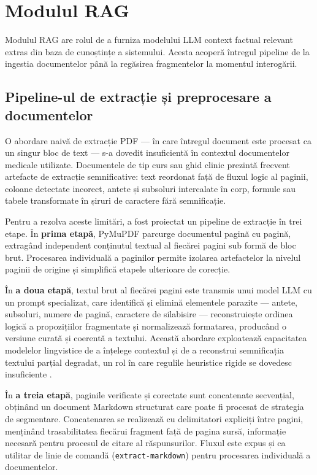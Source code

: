 \documentclass[12pt, a4paper, oneside, romanian]{teza-upb}
\begin{document}
\section{Modulul RAG}

Modulul RAG are rolul de a furniza modelului LLM context factual relevant extras din baza de cunoștințe a sistemului. Acesta acoperă întregul pipeline de la ingestia documentelor până la regăsirea fragmentelor la momentul interogării.

\subsection{Pipeline-ul de extracție și preprocesare a documentelor}

O abordare naivă de extracție PDF — în care întregul document este procesat ca un singur bloc de text — s-a dovedit insuficientă în contextul documentelor medicale utilizate. Documentele de tip curs sau ghid clinic prezintă frecvent artefacte de extracție semnificative: text reordonat față de fluxul logic al paginii, coloane detectate incorect, antete și subsoluri intercalate în corp, formule sau tabele transformate în șiruri de caractere fără semnificație.

Pentru a rezolva aceste limitări, a fost proiectat un pipeline de extracție în trei etape. În \textbf{prima etapă}, PyMuPDF parcurge documentul pagină cu pagină, extragând independent conținutul textual al fiecărei pagini sub formă de bloc brut. Procesarea individuală a paginilor permite izolarea artefactelor la nivelul paginii de origine și simplifică etapele ulterioare de corecție.

În \textbf{a doua etapă}, textul brut al fiecărei pagini este transmis unui model LLM cu un prompt specializat, care identifică și elimină elementele parazite — antete, subsoluri, numere de pagină, caractere de silabisire — reconstruiește ordinea logică a propozițiilor fragmentate și normalizează formatarea, producând o versiune curată și coerentă a textului. Această abordare exploatează capacitatea modelelor lingvistice de a înțelege contextul și de a reconstrui semnificația textului parțial degradat, un rol în care regulile heuristice rigide se dovedesc insuficiente \cite{llm_review_2024}.

În \textbf{a treia etapă}, paginile verificate și corectate sunt concatenate secvențial, obținând un document Markdown structurat care poate fi procesat de strategia de segmentare. Concatenarea se realizează cu delimitatori expliciți între pagini, menținând trasabilitatea fiecărui fragment față de pagina sursă, informație necesară pentru procesul de citare al răspunsurilor. Fluxul este expus și ca utilitar de linie de comandă (\texttt{extract-markdown}) pentru procesarea individuală a documentelor.
\end{document}

